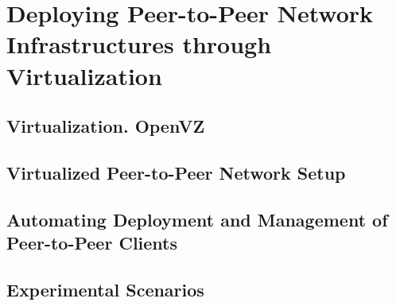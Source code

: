 
\chapter{Deploying Peer-to-Peer Network Infrastructures through
Virtualization}
\label{chapter:virt-infra}

\section{Virtualization. OpenVZ}
\label{sec:virt-infra:openvz}

\section{Virtualized Peer-to-Peer Network Setup}
\label{sec:virt-infra:network-setup}

\section{Automating Deployment and Management of Peer-to-Peer Clients}
\label{sec:virt-infra:auto-deploy}

\section{Experimental Scenarios}
\label{sec:virt-infra:exp-scenarios}
